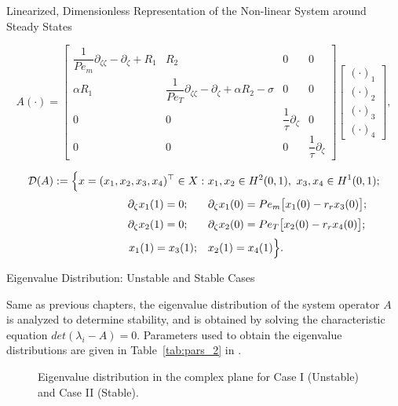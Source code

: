 \documentclass[8pt]{beamer}
\begin{document}
\begin{frame}{Linearized, Dimensionless Representation of the Non-linear System around Steady States}

\begin{equation} \label{eq:3_A_operator}
{A} (\cdot) =
\begin{bmatrix} 
\dfrac{1}{Pe_m} \partial_{\zeta\zeta} - \partial_\zeta + R_1 & R_2 & 0 & 0 \\
\alpha R_1 & \dfrac{1}{Pe_T} \partial_{\zeta\zeta} - \partial_\zeta + \alpha R_2 - \sigma & 0 & 0 \\
0 & 0 & \dfrac{1}{\tau} \partial_\zeta & 0 \\
0 & 0 & 0 & \dfrac{1}{\tau} \partial_\zeta
\end{bmatrix} \begin{bmatrix} (\cdot)_1 \\ (\cdot)_2 \\ (\cdot)_3 \\ (\cdot)_4 \end{bmatrix},
\end{equation}


\begin{equation} \label{eq:3_A_domain}
\begin{aligned}
\mathcal{D}({A}) := \Big\{ x = (x_1, x_2, x_3, x_4)^\top \in X :\ 
& x_1, x_2 \in H^2(0,1),\ x_3, x_4 \in H^1(0,1); \\[0.5ex]
\partial_\zeta x_1(1) = 0; \hspace{1.9em} & \partial_\zeta x_1(0) = Pe_m \bigl[ x_1(0) - r_r x_3(0) \bigr]; \\[0.5ex]
\partial_\zeta x_2(1) = 0; \hspace{1.9em} & \partial_\zeta x_2(0) = Pe_T \bigl[ x_2(0) - r_r x_4(0) \bigr]; \\[0.5ex]
x_1(1) = x_3(1); \quad & x_2(1) = x_4(1)
\Big\}.
\end{aligned}
\end{equation}
\end{frame}




\begin{frame}{Eigenvalue Distribution: Unstable and Stable Cases}

Same as previous chapters, the eigenvalue distribution of the system operator \( A \) is analyzed to determine stability, and is obtained by solving the characteristic equation \( det(\lambda_i - A) = 0 \). Parameters used to obtain the eigenvalue distributions are given in Table~\ref{tab:pars_2} in .

\begin{figure}
    \centering
    
    \caption{Eigenvalue distribution in the complex plane for Case I (Unstable) and Case II (Stable).}
\end{figure}
\end{frame}
\end{document}
